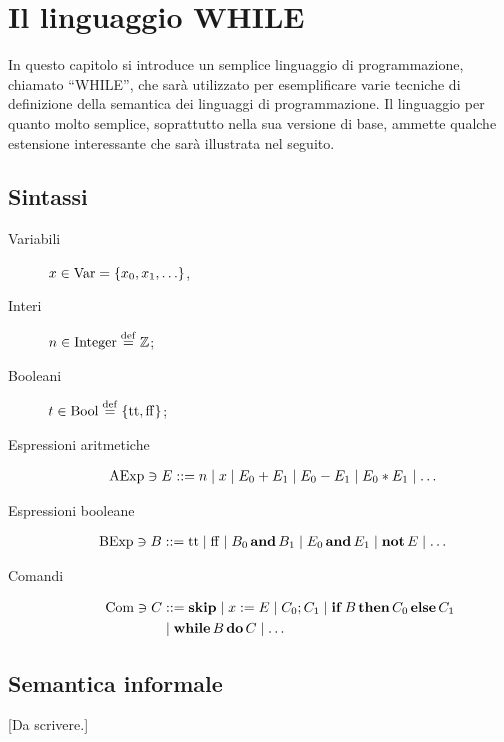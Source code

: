 \chapter{Il linguaggio WHILE}

In questo capitolo si introduce un semplice linguaggio di programmazione,
chiamato ``WHILE'',
che sarà utilizzato per esemplificare varie tecniche di definizione della
semantica dei linguaggi di programmazione.
Il linguaggio per quanto molto semplice, soprattutto nella sua versione di
base, ammette qualche estensione interessante che sarà illustrata nel
seguito.

\section{Sintassi}

\begin{description}
\item[Variabili]
$x \in \mathrm{Var} = \{ x_0, x_1, \ldots \}$,%
\item[Interi]
$n \in \Integer \defeq \Zset$;
\item[Booleani]
$t \in \Bool \defeq \{ \ttv, \ffv \}$;
\item[Espressioni aritmetiche]%
\begin{align*}
  \mathrm{AExp} \ni
  E &::= n \mathrel{\mid} x \mathrel{\mid} E_0 + E_1 \mathrel{\mid} E_0 - E_1 \mathrel{\mid} E_0 * E_1 \mathrel{\mid} \ldots
\end{align*}
\item[Espressioni booleane]%
\begin{align*}
  \mathrm{BExp} \ni
  B &::= \mathrm{tt} \mathrel{\mid} \mathrm{ff} \mathrel{\mid} B_0 \mathop{\textup{\textbf{and}}} B_1 \mathrel{\mid} E_0 \mathop{\textup{\textbf{and}}} E_1
              \mathrel{\mid} \mathop{\textup{\textbf{not}}} E \mathrel{\mid} \ldots
\end{align*}
\item[Comandi]%
\begin{align*}
  \mathrm{Com} \ni
  C &::= \mathop{\textup{\textbf{skip}}} \mathrel{\mid} x := E \mathrel{\mid} C_0 ; C_1
         \mathrel{\mid} \mathop{\textup{\textbf{if}}} B \mathop{\textup{\textbf{then}}} C_0 \mathop{\textup{\textbf{else}}} C_1 \\
    &\mathrel{\mid} \mathop{\textup{\textbf{while}}} B \mathop{\textup{\textbf{do}}} C \mathrel{\mid} \ldots
\end{align*}
\end{description}

\section{Semantica informale}

[Da scrivere.]
